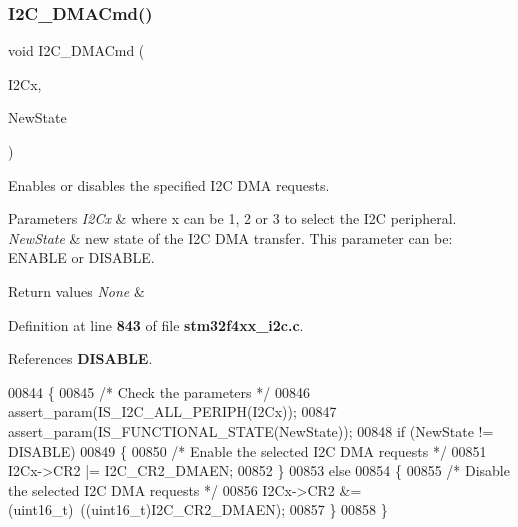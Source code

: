 \subsubsection{I2\+C\+\_\+\+D\+M\+A\+Cmd()}
{\footnotesize\ttfamily void I2\+C\+\_\+\+D\+M\+A\+Cmd (\begin{DoxyParamCaption}\item[{\textbf{ I2\+C\+\_\+\+Type\+Def} $\ast$}]{I2\+Cx,  }\item[{\textbf{ Functional\+State}}]{New\+State }\end{DoxyParamCaption})}



Enables or disables the specified I2C D\+MA requests. 


\begin{DoxyParams}{Parameters}
{\em I2\+Cx} & where x can be 1, 2 or 3 to select the I2C peripheral. \\
\hline
{\em New\+State} & new state of the I2C D\+MA transfer. This parameter can be\+: E\+N\+A\+B\+LE or D\+I\+S\+A\+B\+LE. \\
\hline
\end{DoxyParams}

\begin{DoxyRetVals}{Return values}
{\em None} & \\
\hline
\end{DoxyRetVals}


Definition at line \textbf{ 843} of file \textbf{ stm32f4xx\+\_\+i2c.\+c}.



References \textbf{ D\+I\+S\+A\+B\+LE}.


\begin{DoxyCode}
00844 \{
00845   \textcolor{comment}{/* Check the parameters */}
00846   assert_param(IS_I2C_ALL_PERIPH(I2Cx));
00847   assert_param(IS_FUNCTIONAL_STATE(NewState));
00848   \textcolor{keywordflow}{if} (NewState != DISABLE)
00849   \{
00850     \textcolor{comment}{/* Enable the selected I2C DMA requests */}
00851     I2Cx->CR2 |= I2C_CR2_DMAEN;
00852   \}
00853   \textcolor{keywordflow}{else}
00854   \{
00855     \textcolor{comment}{/* Disable the selected I2C DMA requests */}
00856     I2Cx->CR2 &= (uint16\_t)~((uint16\_t)I2C_CR2_DMAEN);
00857   \}
00858 \}
\end{DoxyCode}
\mbox{\label{group__I2C__Group4_gab2e994c5681eb6ec7c26a03ffe1de060}} 
